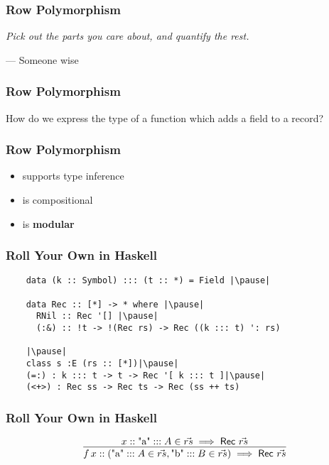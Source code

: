 \documentclass[12pt]{beamer}
\begin{document}
\begin{frame}
  \frametitle{Row Polymorphism}
  \pause
  \emph{Pick out the parts you care about, and quantify the rest.}

  \centerline{--- Someone wise}
\end{frame}

\begin{frame}
  \frametitle{Row Polymorphism}
  How do we express the type of a function which adds a field to a record?\pause
\end{frame}

\begin{frame}
  \frametitle{Row Polymorphism}\pause
  \begin{itemize}
    \item supports type inference\pause
    \item is compositional\pause
    \item is \textbf{modular}\pause
  \end{itemize}
\end{frame}

\begin{frame}[fragile]
  \frametitle{Roll Your Own in Haskell}\pause
  \begin{lstlisting}
    data (k :: Symbol) ::: (t :: *) = Field |\pause|

    data Rec :: [*] -> * where |\pause|
      RNil :: Rec '[] |\pause|
      (:&) :: !t -> !(Rec rs) -> Rec ((k ::: t) ': rs)

    |\pause|
    class s :E (rs :: [*])|\pause|
    (=:) : k ::: t -> t -> Rec '[ k ::: t ]|\pause|
    (<+>) : Rec ss -> Rec ts -> Rec (ss ++ ts)
  \end{lstlisting}
\end{frame}
\begin{frame}
  \frametitle{Roll Your Own in Haskell}\pause
  \[
    \infer{
      f\, x :: (\text{"a"} ::: A\in\vec{rs}, \text{"b"} ::: B\in\vec{rs}) \implies \mathsf{Rec}\ \vec{rs}
    }{
      x :: \text{"a"} ::: A\in\vec{rs}\implies \mathsf{Rec}\ \vec{rs}
    }
  \]
\end{frame}
\end{document}
